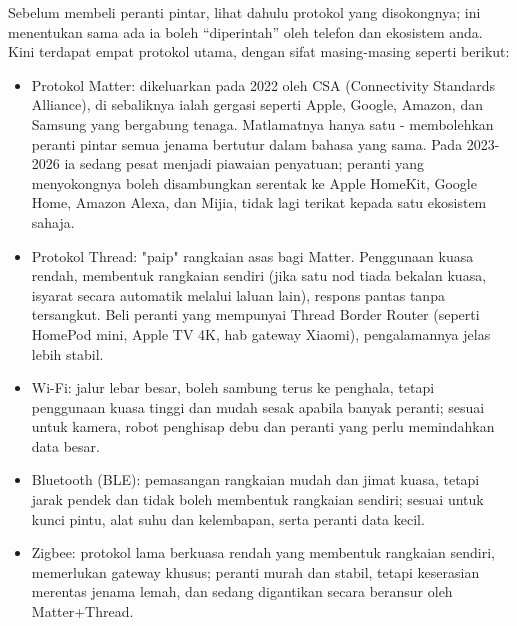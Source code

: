 


Sebelum membeli peranti pintar, lihat dahulu protokol yang disokongnya; ini menentukan sama ada ia boleh “diperintah” oleh telefon dan ekosistem anda. Kini terdapat empat protokol utama, dengan sifat masing-masing seperti berikut:

\begin{itemize}
  \item Protokol Matter: dikeluarkan pada 2022 oleh CSA (Connectivity Standards Alliance), di sebaliknya ialah gergasi seperti Apple, Google, Amazon, dan Samsung yang bergabung tenaga. Matlamatnya hanya satu - membolehkan peranti pintar semua jenama bertutur dalam bahasa yang sama. Pada 2023-2026 ia sedang pesat menjadi piawaian penyatuan; peranti yang menyokongnya boleh disambungkan serentak ke Apple HomeKit, Google Home, Amazon Alexa, dan Mijia, tidak lagi terikat kepada satu ekosistem sahaja.
  \item Protokol Thread: "paip" rangkaian asas bagi Matter. Penggunaan kuasa rendah, membentuk rangkaian sendiri (jika satu nod tiada bekalan kuasa, isyarat secara automatik melalui laluan lain), respons pantas tanpa tersangkut. Beli peranti yang mempunyai Thread Border Router (seperti HomePod mini, Apple TV 4K, hab gateway Xiaomi), pengalamannya jelas lebih stabil.
  \item Wi-Fi: jalur lebar besar, boleh sambung terus ke penghala, tetapi penggunaan kuasa tinggi dan mudah sesak apabila banyak peranti; sesuai untuk kamera, robot penghisap debu dan peranti yang perlu memindahkan data besar.
  \item Bluetooth (BLE): pemasangan rangkaian mudah dan jimat kuasa, tetapi jarak pendek dan tidak boleh membentuk rangkaian sendiri; sesuai untuk kunci pintu, alat suhu dan kelembapan, serta peranti data kecil.
  \item Zigbee: protokol lama berkuasa rendah yang membentuk rangkaian sendiri, memerlukan gateway khusus; peranti murah dan stabil, tetapi keserasian merentas jenama lemah, dan sedang digantikan secara beransur oleh Matter+Thread.
\end{itemize}

